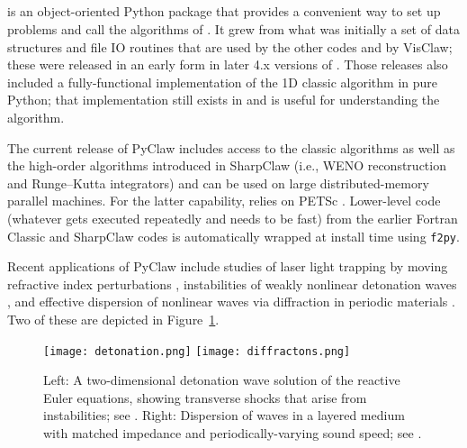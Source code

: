%
%
%

\subsection{\pyclaw} \label{sec:pyclaw}
\pyclaw is an object-oriented Python package that provides a convenient way
to set up problems and call the algorithms of \clawpack.  It grew
from what was initially a set of data structures and file IO routines that are
used by the other \clawpack codes and by VisClaw; these were released in
an early form in later 4.x versions of \clawpack.  Those releases also
included a fully-functional implementation of the 1D classic algorithm
in pure Python; that implementation still exists in \pyclaw and is useful
for understanding the algorithm.

The current release of PyClaw includes access to the classic algorithms as well
as the high-order algorithms introduced in SharpClaw \cite{2013_sharpclaw} (i.e., WENO
reconstruction and Runge--Kutta integrators) and can be used on large
distributed-memory parallel machines.  For the latter capability, \pyclaw
relies on PETSc \cite{petsc-user-ref}.
Lower-level code (whatever gets executed
repeatedly and needs to be fast) from the earlier Fortran Classic and SharpClaw
codes is automatically wrapped at install time using \texttt{f2py}.

Recent applications of PyClaw include studies of laser light trapping by moving
refractive index perturbations \cite{sanroman_thesis}, instabilities of weakly nonlinear detonation
waves \cite{faria2015qualitative}, and effective dispersion of nonlinear waves via diffraction in
periodic materials \cite{2015_diffractons}.  Two of these are depicted in 
Figure~\ref{fig:pyclaw-apps}.

\begin{figure}
\hfil\texttt{[image: detonation.png]}
\hskip 5pt
\hfil\texttt{[image: diffractons.png]}
\hskip 5pt
\caption{\label{fig:pyclaw-apps}
Left: A two-dimensional detonation wave solution of the reactive Euler equations,
showing transverse shocks that arise from instabilities; see \cite{faria2015qualitative}.
Right: Dispersion of waves in a layered medium with matched impedance and periodically-varying
sound speed; see \cite{2015_diffractons}.}
\end{figure}


